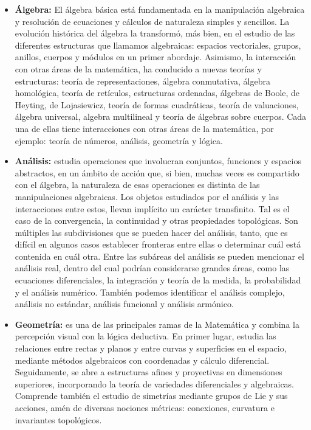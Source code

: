 \begin{itemize}
    
     \color{blue} \item \color{black} \textbf{Álgebra:} El álgebra básica está fundamentada en la manipulación algebraica y resolución de ecuaciones y cálculos de naturaleza simples y sencillos. La evolución histórica del álgebra la transformó, más bien, en el estudio de las diferentes estructuras que llamamos algebraicas: espacios vectoriales, grupos, anillos, cuerpos y módulos en un primer abordaje. Asimismo, la interacción con otras áreas de la matemática, ha conducido a nuevas teorías y estructuras: teoría de representaciones, álgebra conmutativa, álgebra homológica, teoría de retículos, estructuras ordenadas, álgebras de Boole, de Heyting, de Lojasiewicz, teoría de formas cuadráticas, teoría de valuaciones, álgebra universal, algebra multilineal y teoría de álgebras sobre cuerpos. Cada una de ellas tiene interacciones con otras áreas de la matemática, por ejemplo: teoría de números, análisis, geometría y lógica. 
     
    \color{blue} \item \color{black}  \textbf{Análisis:} estudia operaciones que involucran conjuntos, funciones y espacios abstractos, en un ámbito de acción que, si bien, muchas veces es compartido con el álgebra, la naturaleza de esas operaciones es distinta de las manipulaciones algebraicas. Los objetos estudiados por el análisis y las interacciones entre estos, llevan implícito un carácter transfinito. Tal es el caso de la convergencia, la continuidad y otras propiedades topológicas. Son múltiples las subdivisiones que se pueden hacer del análisis, tanto, que es difícil en algunos casos establecer fronteras entre ellas o determinar cuál está contenida en cuál otra. Entre las subáreas del análisis se pueden mencionar el análisis real, dentro del cual podrían considerarse grandes áreas, como las ecuaciones diferenciales, la integración y teoría de la medida, la probabilidad y el análisis numérico. También podemos identificar el análisis complejo, análisis no estándar, análisis funcional y análisis armónico.
    
    \color{blue} \item \color{black} \textbf{Geometría:} es una de las principales ramas de la Matemática y combina la percepción visual con la lógica deductiva. En primer lugar, estudia las relaciones entre rectas y planos y entre curvas y superficies en el espacio, mediante métodos algebraicos con coordenadas y cálculo diferencial. Seguidamente, se abre a estructuras afines y proyectivas en dimensiones superiores, incorporando la teoría de variedades diferenciales y algebraicas. Comprende también el estudio de simetrías mediante grupos de Lie y sus acciones, amén de diversas nociones métricas: conexiones, curvatura e invariantes topológicos.
    

\end{itemize}
